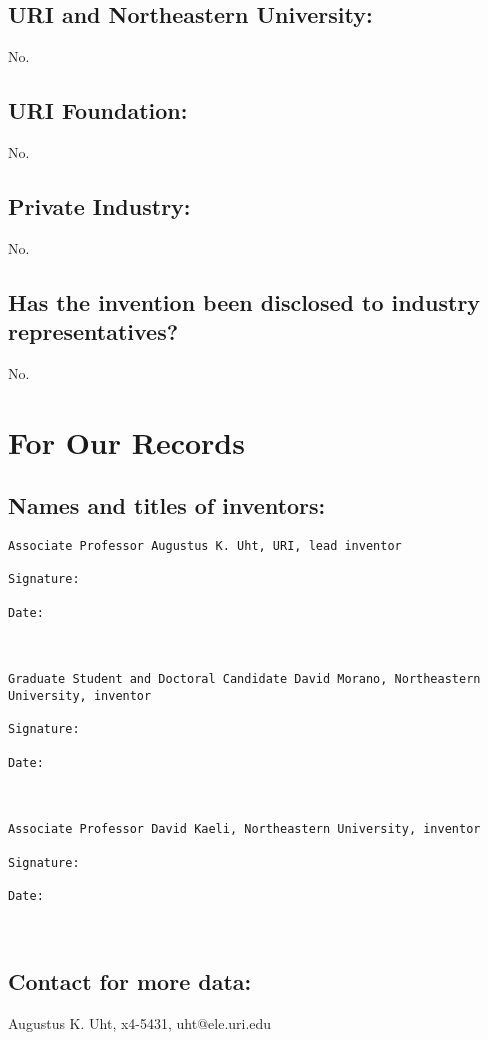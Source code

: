 \documentclass[10pt,dvips]{article}
\begin{document}
\subsection{URI and Northeastern University:} No.

\subsection{URI Foundation:} No.

\subsection{Private Industry:} No.

\subsection{Has the invention been disclosed to industry representatives?} No.

\newpage

\section{For Our Records}

\subsection{Names and titles of inventors:}

\begin{verbatim}
Associate Professor Augustus K. Uht, URI, lead inventor

Signature:

Date:



Graduate Student and Doctoral Candidate David Morano, Northeastern University, inventor

Signature:

Date:



Associate Professor David Kaeli, Northeastern University, inventor

Signature:

Date:



\end{verbatim}

\subsection{Contact for more data:} Augustus K. Uht, x4-5431, uht@ele.uri.edu
\end{document}
